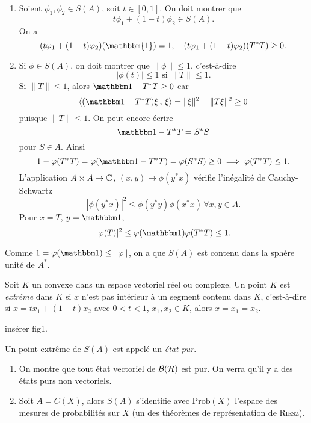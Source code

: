\begin{preuve}
  \begin{enumerate}
  \item Soient $\phi_1, \phi_2 \in S(A)$, soit $t \in [0,1]$. On doit montrer que 
    \[ t \phi_1 + (1-t)\phi_2 \in S(A). \]
    On a 
    \[ (t \phi_1 + (1-t)\phi_2)(\mathbbm{1}) = 1,\quad (t \phi_1 + (1-t)\phi_2)(T^\ast T) \geq 0. \]
    
  \item Si $\phi \in S(A)$, on doit montrer que $\|\phi\| \leq 1$, c'est-à-dire 
    \[ |\phi(t)| \leq 1 \text{ si } \|T\| \leq 1. \]
    Si $\|T\| \leq 1$, alors $\un - T^\ast T \geq 0$ car 
    \[ \left \langle (\un - T^\ast T)\xi\, ,\, \xi \right \rangle  = \|\xi\|^2 - \|T \xi\|^2 \geq 0 \]
    puisque $\|T\| \leq 1$. On peut encore écrire 
    \[ \un - T^\ast T = S^\ast S \]
    pour $S \in A$. Ainsi 
    \[ 1 - \phi(T^\ast T) = \phi(\un - T^\ast T) = \phi(S^\ast S) \geq 0 \implies \phi(T^\ast T) \leq 1. \]
    L'application $A \times A \to \mathbb{C}$, $(x, y) \mapsto \phi(y^\ast x)$ vérifie l'inégalité de Cauchy-Schwartz 
    \[ |\phi(y^\ast x)|^2 \leq \phi(y^\ast y) \phi(x^\ast x)\, \forall x, y \in A. \]
    Pour $x = T$, $y = \un$, 
    \[ |\phi(T)|^2 \leq \phi(\un) \phi(T^\ast T) \leq 1. \]
  \end{enumerate}
\end{preuve}

\begin{rem}
  Comme $1 = \phi(\un) \leq \|\phi\|$, on a que $S(A)$ est contenu dans la sphère unité de $A^\ast$.
\end{rem}

\begin{defi}
  Soit $K$ un convexe dans un espace vectoriel réel ou complexe. Un point $K$ est \emph{extrême} dans $K$ si $x$ n'est pas intérieur à un segment contenu dans $K$, c'est-à-dire si $x =
  tx_1 + (1-t)x_2$ avec $0 < t < 1$, $x_1, x_2 \in K$, alors $x = x_1 = x_2$.

  insérer fig1.

  Un point extrême de $S(A)$ est
  appelé un \emph{état pur}.
\end{defi}

\begin{exs}
  \begin{enumerate}
  \item On montre que tout état vectoriel de $\mathcal{B}(\mathcal{H})$ est pur. On verra qu'il y a des états purs non vectoriels.
  \item Soit $A = C(X)$, alors $S(A)$ s'identifie avec $\mathrm{Prob}(X)$ l'espace des mesures de probabilités
    sur $X$ (un des théorèmes de représentation de \textsc{Riesz}).
  \end{enumerate}
\end{exs}

